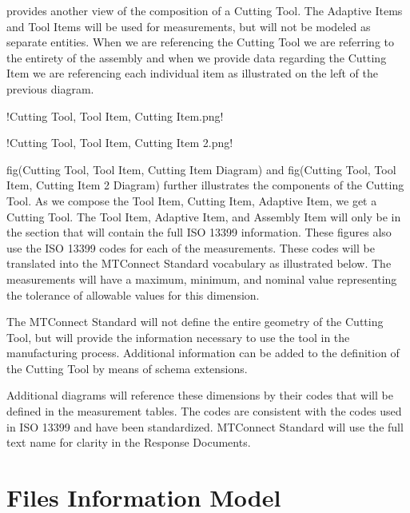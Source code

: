 \FloatBarrier


 provides another view of the composition of a Cutting Tool. The Adaptive Items and Tool Items will be used for measurements, but will not be modeled as separate entities. When we are referencing the Cutting Tool we are referring to the entirety of the assembly and when we provide data regarding the Cutting Item we are referencing each individual item as illustrated on the left of the previous diagram.

!Cutting Tool, Tool Item, Cutting Item.png!

!Cutting Tool, Tool Item, Cutting Item 2.png!

{{fig(Cutting Tool, Tool Item, Cutting Item Diagram)}} and {{fig(Cutting Tool, Tool Item, Cutting Item 2 Diagram)}} further illustrates the components of the Cutting Tool. As we compose the Tool Item, Cutting Item, Adaptive Item, we get a Cutting Tool. The Tool Item, Adaptive Item, and Assembly Item will only be in the  section that will contain the full ISO 13399 information. These figures also use the ISO 13399 codes for each of the measurements. These codes will be translated into the MTConnect Standard vocabulary as illustrated below. The measurements will have a maximum, minimum, and nominal value representing the tolerance of allowable values for this dimension.

The MTConnect Standard will not define the entire geometry of the Cutting Tool, but will provide the information necessary to use the tool in the manufacturing process. Additional information can be added to the definition of the Cutting Tool by means of schema extensions.

Additional diagrams will reference these dimensions by their codes that will be defined in the measurement tables. The codes are consistent with the codes used in ISO 13399 and have been standardized. MTConnect Standard will use the full text name for clarity in the \glspl{Response Document}.













\section{Files Information Model}
\label{sec:Files Information Model}

